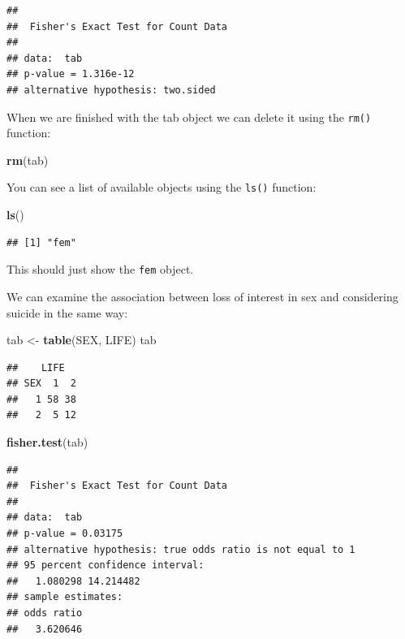 \documentclass[]{book}
\newenvironment{Shaded}{\begin{snugshade}}{\end{snugshade}}
\newcommand{\KeywordTok}[1]{\textcolor[rgb]{0.13,0.29,0.53}{\textbf{#1}}}
\newcommand{\StringTok}[1]{\textcolor[rgb]{0.31,0.60,0.02}{#1}}
\newcommand{\NormalTok}[1]{#1}
\theoremstyle{definition}
\theoremstyle{definition}
\theoremstyle{definition}
\theoremstyle{remark}
\begin{document}
\begin{verbatim}
## 
##  Fisher's Exact Test for Count Data
## 
## data:  tab
## p-value = 1.316e-12
## alternative hypothesis: two.sided
\end{verbatim}

When we are finished with the tab object we can delete it using the
\texttt{rm()} function:

\begin{Shaded}
\begin{Highlighting}[]
\KeywordTok{rm}\NormalTok{(tab)}
\end{Highlighting}
\end{Shaded}

You can see a list of available objects using the \texttt{ls()}
function:

\begin{Shaded}
\begin{Highlighting}[]
\KeywordTok{ls}\NormalTok{()}
\end{Highlighting}
\end{Shaded}

\begin{verbatim}
## [1] "fem"
\end{verbatim}

This should just show the \texttt{fem} object.

We can examine the association between loss of interest in sex and
considering suicide in the same way:

\begin{Shaded}
\begin{Highlighting}[]
\NormalTok{tab <-}\StringTok{ }\KeywordTok{table}\NormalTok{(SEX, LIFE)}
\NormalTok{tab}
\end{Highlighting}
\end{Shaded}

\begin{verbatim}
##    LIFE
## SEX  1  2
##   1 58 38
##   2  5 12
\end{verbatim}

\begin{Shaded}
\begin{Highlighting}[]
\KeywordTok{fisher.test}\NormalTok{(tab)}
\end{Highlighting}
\end{Shaded}

\begin{verbatim}
## 
##  Fisher's Exact Test for Count Data
## 
## data:  tab
## p-value = 0.03175
## alternative hypothesis: true odds ratio is not equal to 1
## 95 percent confidence interval:
##   1.080298 14.214482
## sample estimates:
## odds ratio 
##   3.620646
\end{verbatim}
\end{document}
